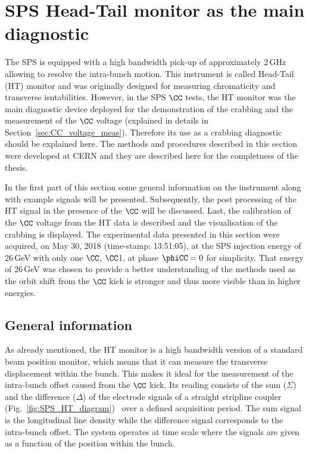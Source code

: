 \section{SPS Head-Tail monitor as the main diagnostic}\label{sec:HT_info}

The SPS is equipped with a high bandwidth pick-up of approximately 2\,GHz allowing to resolve the intra-bunch motion. This instrument is called Head-Tail (HT) monitor and was originally designed for measuring chromaticity and transverse isntabilities. However, in the SPS $\CC$ tests, the HT monitor was the main diagnostic device deployed for the demonstration of the crabbing and the measurement of the $\CC$ voltage (explained in details in Section~\ref{sec:CC_voltage_meas}). Therefore its use as a crabbing diagnostic should be explained here. The methods and procedures described in this section were developed at CERN and they are described here for the completness of the thesis.

 In the first part of this section some general information on the instrument along with example signals will be presented. Subsequently, the post processing of the HT signal in the presence of the $\CC$ will be discussed. Last, the calibration of the $\CC$ voltage from the HT data is described and the visualisation of the crabbing is displayed. The experimental data presented in this section were acquired, on May 30, 2018 (time-stamp: 13:51:05), at the SPS injection energy of 26\,GeV with only one $\CC$, $\CC$1, at phase $\phiCC=0$ for simplicity. That energy of 26\,GeV was chosen to provide a better understanding of the methods used as the orbit shift from the $\CC$ kick is stronger and thus more visible than in higher energies.


\subsection{General information}\label{subsec:HT_general_info}
As already mentioned, the HT monitor is a high bandwidth version of a standard beam position monitor, which means that it can measure the transverse displacement within the bunch. This makes it ideal for the measurement of the intra-bunch offset caused from the $\CC$ kick. Its reading consists of the sum ($\Sigma$) and the  difference ($\Delta$) of the electrode signals of a straight stripline coupler (Fig.~\ref{fig:SPS_HT_diagram})~\cite{Jones:987561, Levens:2313358} over a defined acquisition period. The sum signal is the longitudinal line density while the difference signal corresponds to the intra-bunch offset. The system operates at time scale where the signals are given as a function of the position within the bunch.


